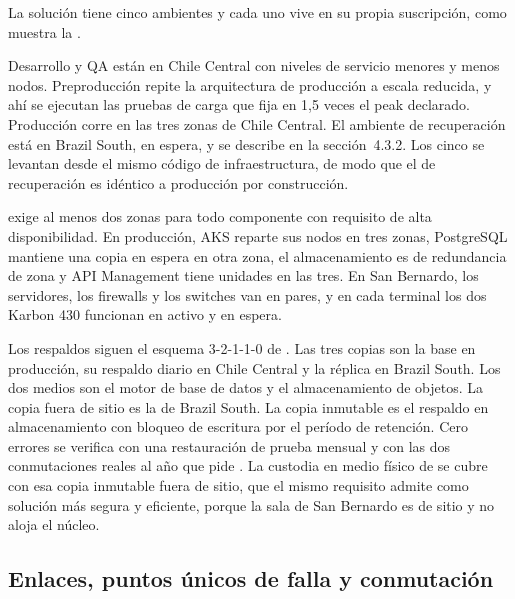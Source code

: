 La solución tiene cinco ambientes y cada uno vive en su propia suscripción, como muestra la
.


Desarrollo y QA están en Chile Central con niveles de servicio menores y menos nodos. Preproducción
repite la arquitectura de producción a escala reducida, y ahí se ejecutan las pruebas de carga que
 fija en 1,5 veces el peak declarado. Producción corre en las tres zonas de Chile
Central. El ambiente de recuperación está en Brazil South, en espera, y se describe en la
sección~4.3.2. Los cinco se levantan desde el mismo código de infraestructura, de modo que el de
recuperación es idéntico a producción por construcción.

 exige al menos dos zonas para todo componente con requisito de alta
disponibilidad. En producción, AKS reparte sus nodos en tres zonas, PostgreSQL mantiene una copia en
espera en otra zona, el almacenamiento es de redundancia de zona y API Management tiene unidades en las
tres. En San Bernardo, los servidores, los firewalls y los switches van en pares, y en cada terminal los
dos Karbon 430 funcionan en activo y en espera.

Los respaldos siguen el esquema 3-2-1-1-0 de . Las tres copias son la base en
producción, su respaldo diario en Chile Central y la réplica en Brazil South. Los dos medios son el
motor de base de datos y el almacenamiento de objetos. La copia fuera de sitio es la de Brazil South.
La copia inmutable es el respaldo en almacenamiento con bloqueo de escritura por el período de
retención. Cero errores se verifica con una restauración de prueba mensual y con las dos conmutaciones
reales al año que pide . La custodia en medio físico de  se
cubre con esa copia inmutable fuera de sitio, que el mismo requisito admite como solución más segura y
eficiente, porque la sala de San Bernardo es de sitio y no aloja el núcleo.

\subsection{Enlaces, puntos únicos de falla y conmutación}\label{sec:4-enlaces}

